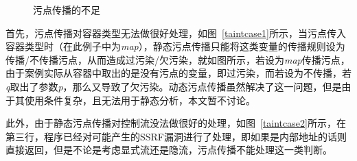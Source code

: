 \begin{figure}
	\centering
	\caption{污点传播的不足}
	\label{fig:rq3} %
\end{figure}
首先，污点传播对容器类型无法做很好处理，如图~\ref{taintcase1}所示，当污点传入容器类型时（在此例子中为\textit{map}），静态污点传播只能将这类变量的传播规则设为传播/不传播污点，从而造成过污染/欠污染，就如图所示，若设为\textit{map}传播污点，由于案例实际从容器中取出的是没有污点的变量，即过污染，而若设为不传播，若\textit{q}取出了参数\textit{p}，那么又导致了欠污染。动态污点传播虽然解决了这一问题，但是由于其使用条件复杂，且无法用于静态分析，本文暂不讨论。

此外，由于静态污点传播对控制流没法做很好的处理，如图~\ref{taintcase2}所示，在第三行，程序已经对可能产生的SSRF漏洞进行了处理，即如果是内部地址的话则直接返回，但是不论是考虑显式流还是隐流，污点传播不能处理这一类判断。


